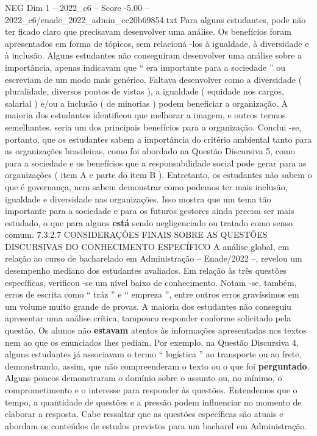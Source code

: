 \begin{textsample}{NEG Dim 1 – 2022\_c6 – Score -5.00 – 2022\_c6/enade\_2022\_admin\_cc20b69854.txt}
Para alguns estudantes, pode não ter ficado claro que precisavam desenvolver uma análise.
Os benefícios foram apresentados em forma de tópicos, sem relacioná -los à igualdade, à diversidade e à inclusão.
Alguns estudantes não conseguiram desenvolver uma análise sobre a importância, apenas indicavam que “ era importante para a sociedade ” ou escreviam de um modo mais genérico.
Faltava desenvolver como a diversidade ( pluralidade, diversos pontos de vistas ), a igualdade ( equidade nos cargos, salarial ) e/ou a inclusão ( de minorias ) podem beneficiar a organização.
A maioria dos estudantes identificou que melhorar a imagem, e outros termos semelhantes, seria um dos principais benefícios para a organização.
Conclui -se, portanto, que os estudantes sabem a importância do critério ambiental tanto para as organizações brasileiras, como foi abordado na Questão Discursiva 5, como para a sociedade e os benefícios que a responsabilidade social pode gerar para as organizações ( item A e parte do item B ).
Entretanto, os estudantes não sabem o que é governança, nem sabem demonstrar como podemos ter mais inclusão, igualdade e diversidade nas organizações.
Isso mostra que um tema tão importante para a sociedade e para os futuros gestores ainda precisa ser mais estudado, o que para alguns \textbf{está} sendo negligenciado ou tratado como senso comum. 7.3.2.7 CONSIDERAÇÕES FINAIS SOBRE AS QUESTÕES DISCURSIVAS DO CONHECIMENTO ESPECÍFICO A análise global, em relação ao curso de bacharelado em Administração – Enade/2022 –, revelou um desempenho mediano dos estudantes avaliados.
Em relação às três questões específicas, verificou -se um nível baixo de conhecimento.
Notam -se, também, erros de escrita como “ tráz ” e “ empreza ”, entre outros erros gravíssimos em um volume muito grande de provas.
A maioria dos estudantes não conseguiu apresentar uma análise crítica, tampouco responder conforme solicitado pela questão.
Os alunos não \textbf{estavam} atentos às informações apresentadas nos textos nem ao que os enunciados lhes pediam.
Por exemplo, na Questão Discursiva 4, alguns estudantes já associavam o termo “ logística ” ao transporte ou ao frete, demonstrando, assim, que não compreenderam o texto ou o que foi \textbf{perguntado}.
Alguns poucos demonstraram o domínio sobre o assunto ou, no mínimo, o comprometimento e o interesse para responder às questões.
Entendemos que o tempo, a quantidade de questões e a pressão podem influenciar no momento de elaborar a resposta.
Cabe ressaltar que as questões específicas são atuais e abordam os conteúdos de estudos previstos para um bacharel em Administração.

\end{textsample}
